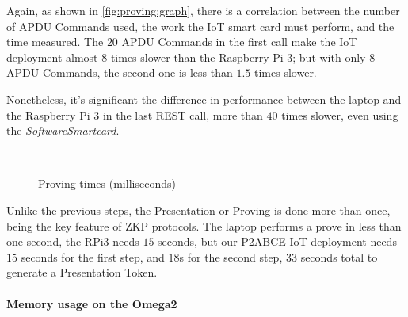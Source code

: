 Again, as shown in \autoref{fig:proving:graph}, there is a correlation between the number of APDU Commands used, the work the IoT smart card must perform, and the time measured. The $20$ APDU Commands in the first call make the IoT deployment almost $8$ times slower than the Raspberry Pi 3; but with only $8$ APDU Commands, the second one is less than $1.5$ times slower.

Nonetheless, it's significant the difference in performance between the laptop and the Raspberry Pi 3 in the last REST call, more than $40$ times slower, even using the \textit{SoftwareSmartcard}.


\begin{figure}[bth]
	\myfloatalign
	 \quad
	 \\
	\caption{Proving times (milliseconds)}
	\label{fig:proving:graph}
\end{figure}

Unlike the previous steps, the Presentation or Proving is done more than once, being the key feature of ZKP protocols. The laptop performs a prove in less than one second, the RPi3 needs $15$ seconds, but our P2ABCE IoT deployment needs $15$ seconds for the first step, and $18$s for the second step, $33$ seconds total to generate a Presentation Token.




\hfil

\paragraph{Memory usage on the Omega2}\hfil

